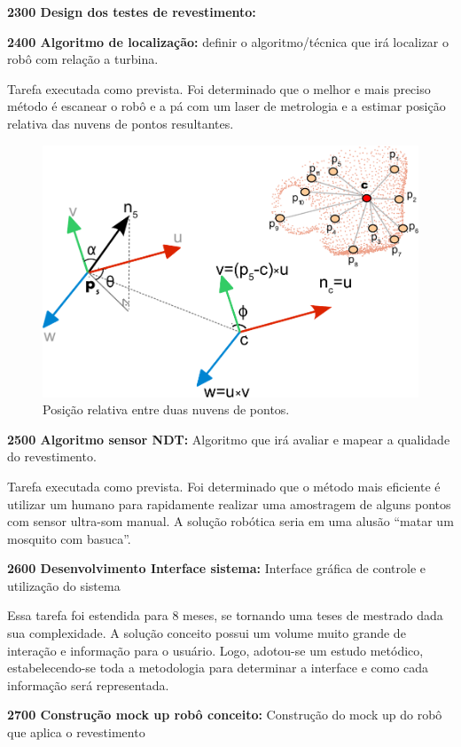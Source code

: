 \textbf{2300 Design dos testes de revestimento:} %

\textbf{2400 Algoritmo de localização:} definir o algoritmo/técnica que irá
localizar o robô com relação a turbina.

Tarefa executada como prevista. Foi determinado que o melhor e mais preciso
método é escanear o robô e a pá com um laser de metrologia e a estimar posição
relativa das nuvens de pontos resultantes.

\begin{figure}\centering
\includegraphics[width=0.9\columnwidth]{figs/pc_position}
\caption{Posição relativa entre duas nuvens de pontos.}
\end{figure} 

\textbf{2500 Algoritmo sensor NDT:} Algoritmo que irá avaliar e mapear a
qualidade do revestimento.

Tarefa executada como prevista. Foi determinado que o método mais eficiente é
utilizar um humano para rapidamente realizar uma amostragem de alguns pontos com
sensor ultra-som manual. A solução robótica seria em uma alusão “matar um mosquito com basuca”.

\textbf{2600 Desenvolvimento Interface sistema:} Interface gráfica de controle e
utilização do sistema

Essa tarefa foi estendida para 8 meses, se tornando uma teses de mestrado dada
sua complexidade. A solução conceito possui um volume muito grande de interação
e informação para o usuário. Logo, adotou-se um estudo metódico,
estabelecendo-se toda a metodologia para determinar a interface e como cada
informação será representada.

\textbf{2700 Construção mock up robô conceito:} Construção do mock up do robô
que aplica o revestimento

